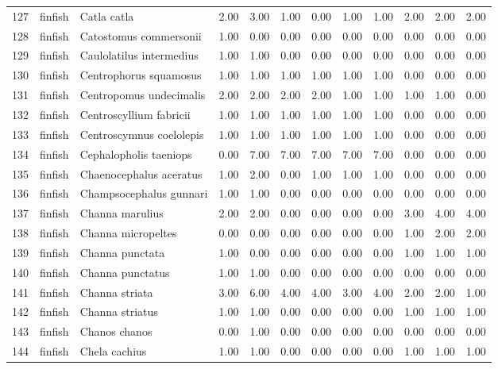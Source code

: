 \begin{table}[ht]
\begin{tabular}{rllrrrrrrrrr}
  127 & finfish & Catla catla & 2.00 & 3.00 & 1.00 & 0.00 & 1.00 & 1.00 & 2.00 & 2.00 & 2.00 \\ 
  128 & finfish & Catostomus commersonii & 1.00 & 0.00 & 0.00 & 0.00 & 0.00 & 0.00 & 0.00 & 0.00 & 0.00 \\ 
  129 & finfish & Caulolatilus intermedius & 1.00 & 1.00 & 0.00 & 0.00 & 0.00 & 0.00 & 0.00 & 0.00 & 0.00 \\ 
  130 & finfish & Centrophorus squamosus & 1.00 & 1.00 & 1.00 & 1.00 & 1.00 & 1.00 & 0.00 & 0.00 & 0.00 \\ 
  131 & finfish & Centropomus undecimalis & 2.00 & 2.00 & 2.00 & 2.00 & 1.00 & 1.00 & 1.00 & 1.00 & 0.00 \\ 
  132 & finfish & Centroscyllium fabricii & 1.00 & 1.00 & 1.00 & 1.00 & 1.00 & 1.00 & 0.00 & 0.00 & 0.00 \\ 
  133 & finfish & Centroscymnus coelolepis & 1.00 & 1.00 & 1.00 & 1.00 & 1.00 & 1.00 & 0.00 & 0.00 & 0.00 \\ 
  134 & finfish & Cephalopholis taeniops & 0.00 & 7.00 & 7.00 & 7.00 & 7.00 & 7.00 & 0.00 & 0.00 & 0.00 \\ 
  135 & finfish & Chaenocephalus aceratus & 1.00 & 2.00 & 0.00 & 1.00 & 1.00 & 1.00 & 0.00 & 0.00 & 0.00 \\ 
  136 & finfish & Champsocephalus gunnari & 1.00 & 1.00 & 0.00 & 0.00 & 0.00 & 0.00 & 0.00 & 0.00 & 0.00 \\ 
  137 & finfish & Channa marulius & 2.00 & 2.00 & 0.00 & 0.00 & 0.00 & 0.00 & 3.00 & 4.00 & 4.00 \\ 
  138 & finfish & Channa micropeltes & 0.00 & 0.00 & 0.00 & 0.00 & 0.00 & 0.00 & 1.00 & 2.00 & 2.00 \\ 
  139 & finfish & Channa punctata & 1.00 & 0.00 & 0.00 & 0.00 & 0.00 & 0.00 & 1.00 & 1.00 & 1.00 \\ 
  140 & finfish & Channa punctatus & 1.00 & 1.00 & 0.00 & 0.00 & 0.00 & 0.00 & 0.00 & 0.00 & 0.00 \\ 
  141 & finfish & Channa striata & 3.00 & 6.00 & 4.00 & 4.00 & 3.00 & 4.00 & 2.00 & 2.00 & 1.00 \\ 
  142 & finfish & Channa striatus & 1.00 & 1.00 & 0.00 & 0.00 & 0.00 & 0.00 & 1.00 & 1.00 & 1.00 \\ 
  143 & finfish & Chanos chanos & 0.00 & 1.00 & 0.00 & 0.00 & 0.00 & 0.00 & 0.00 & 0.00 & 0.00 \\ 
  144 & finfish & Chela cachius & 1.00 & 1.00 & 0.00 & 0.00 & 0.00 & 0.00 & 1.00 & 1.00 & 1.00 \\ 

\end{tabular}
\end{table}
